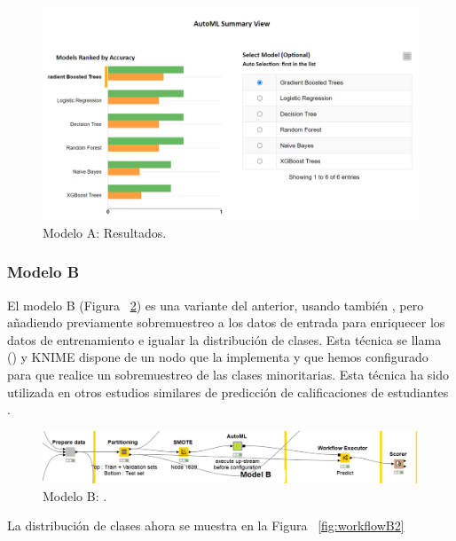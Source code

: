\begin{figure}[!htb]
	\centering
	\includegraphics[width=1\textwidth]{img/workflowA4.png}
	\caption{Modelo A: Resultados.}
	\label{fig:workflowA4}
\end{figure}
\FloatBarrier

\subsubsection{Modelo B}

El modelo B (Figura ~\ref{fig:workflowB1}) es una variante del anterior, usando también , pero añadiendo previamente sobremuestreo a los datos 
de entrada para enriquecer los datos de entrenamiento e igualar la distribución de clases. Esta técnica se llama 
 \cite{smote} () y KNIME dispone de un nodo que la implementa y que hemos 
configurado para que realice un sobremuestreo de las clases minoritarias. Esta técnica ha sido utilizada en otros estudios similares de 
predicción de calificaciones de estudiantes \cite{multiclass-pred}. 

\begin{figure}[!htb]
	\centering
	\includegraphics[width=1\textwidth]{img/workflowB1.png}
	\caption{Modelo B: .}
	\label{fig:workflowB1}
\end{figure}
\FloatBarrier

La distribución de clases ahora se muestra en la Figura ~\ref{fig:workflowB2}


